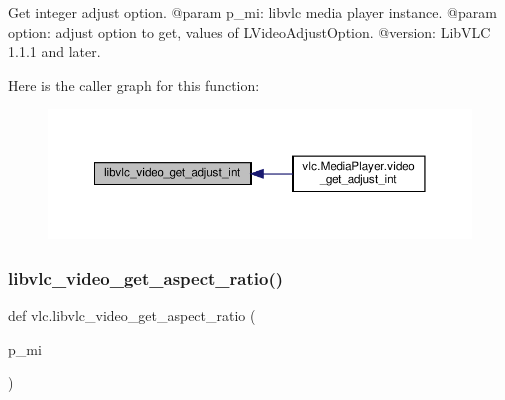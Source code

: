 \begin{DoxyVerb}Get integer adjust option.
@param p_mi: libvlc media player instance.
@param option: adjust option to get, values of L{VideoAdjustOption}.
@version: LibVLC 1.1.1 and later.
\end{DoxyVerb}
 Here is the caller graph for this function\+:
\nopagebreak
\begin{figure}[H]
\begin{center}
\leavevmode
\includegraphics[width=350pt]{namespacevlc_ab0a3bb5f8036e686a3dedc3703aa7c06_icgraph}
\end{center}
\end{figure}
\mbox{\label{namespacevlc_ae8a30662bf8336cac0e165ab5eac932a}} 
\subsubsection{\texorpdfstring{libvlc\+\_\+video\+\_\+get\+\_\+aspect\+\_\+ratio()}{libvlc\_video\_get\_aspect\_ratio()}}
{\footnotesize\ttfamily def vlc.\+libvlc\+\_\+video\+\_\+get\+\_\+aspect\+\_\+ratio (\begin{DoxyParamCaption}\item[{}]{p\+\_\+mi }\end{DoxyParamCaption})}

